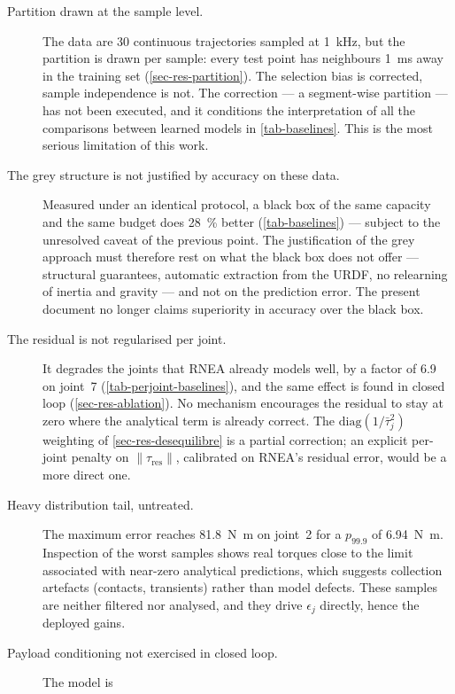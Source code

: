 \documentclass[a4paper, oneside]{article}
\newcommand{\taures}{\ensuremath{\tau_{\mathrm{res}}}}
\begin{document}
\begin{description}
    \item[Partition drawn at the sample level.] The data are \num{30}
    continuous trajectories sampled at \SI{1}{\kilo\hertz}, but the partition
    is drawn per sample: every test point has neighbours
    \SI{1}{\milli\second} away in the training set
    (\cref{sec-res-partition}). The selection bias is corrected, sample
    independence is not. The correction --- a segment-wise partition --- has
    not been executed, and it conditions the interpretation of all the
    comparisons between learned models in \cref{tab-baselines}. This is the
    most serious limitation of this work.
    \item[The grey structure is not justified by accuracy on these data.]
    Measured under an identical protocol, a black box of the same capacity and
    the same budget does \SI{28}{\percent} better (\cref{tab-baselines}) ---
    subject to the unresolved caveat of the previous point. The justification
    of the grey approach must therefore rest on what the black box does not
    offer --- structural guarantees, automatic extraction from the URDF, no
    relearning of inertia and gravity --- and not on the prediction error. The
    present document no longer claims superiority in accuracy over the black
    box.
    \item[The residual is not regularised per joint.] It degrades the joints
    that RNEA already models well, by a factor of \num{6.9} on joint~7
    (\cref{tab-perjoint-baselines}), and the same effect is found in closed
    loop (\cref{sec-res-ablation}). No mechanism encourages the residual to
    stay at zero where the analytical term is already correct. The
    $\mathrm{diag}(1/\bar{\tau}_j^2)$ weighting of
    \cref{sec-res-desequilibre} is a partial correction; an explicit per-joint
    penalty on $\|\taures\|$, calibrated on RNEA's residual error, would be a
    more direct one.
    \item[Heavy distribution tail, untreated.] The maximum error reaches
    \SI{81.8}{\newton\meter} on joint~2 for a $p_{99.9}$ of
    \SI{6.94}{\newton\meter}. Inspection of the worst samples shows real
    torques close to the limit associated with near-zero analytical
    predictions, which suggests collection artefacts (contacts, transients)
    rather than model defects. These samples are neither filtered nor analysed,
    and they drive $\epsilon_j$ directly, hence the deployed gains.
    \item[Payload conditioning not exercised in closed loop.] The model is

\end{description}
\end{document}
